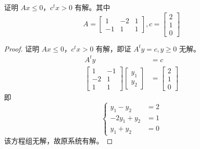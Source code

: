 \begin{example}
    证明 $Ax \le 0$，$c^tx > 0$ 有解。其中
    \[
        A = \begin{bmatrix}
            1 & -2 & 1\\
            -1 & 1 & 1
        \end{bmatrix},
        c = \begin{bmatrix}
            2\\
            1\\
            0
        \end{bmatrix} 
    \]

    \begin{proof}
        证明 $Ax \le 0$，$c^tx > 0$ 有解，即证 $A^ty = c, y \ge 0$ 无解。
        \begin{align*}
            A^ty &= c\\
            \begin{bmatrix}
                1 & -1\\
                -2 & 1\\
                1 & 1
            \end{bmatrix}
            \begin{bmatrix}
                y_1\\
                y_2
            \end{bmatrix}
            &=\begin{bmatrix}
                2\\
                1\\
                0
            \end{bmatrix} 
        \end{align*}
        即 
        \[
            \begin{cases}
                y_1 - y_2 &= 2\\
                -2y_1 + y_2 &= 1\\
                y_1 + y_2 &= 0
            \end{cases}    
        \]
        该方程组无解，故原系统有解。
    \end{proof}
\end{example}


